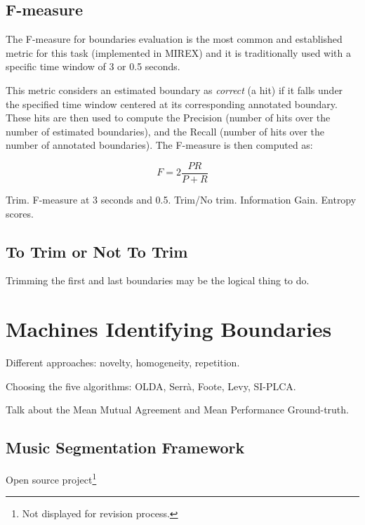 \documentclass{article}
\begin{document}
\subsection{F-measure}

The F-measure for boundaries evaluation is the most common and established metric for this task (implemented in MIREX) and it is traditionally used with a specific time window of 3 or 0.5 seconds\cite{Ong2005}. 

This metric considers an estimated boundary as \emph{correct} (a hit) if it falls under the specified time window centered at its corresponding annotated boundary.
These hits are then used to compute the Precision (number of hits over the number of estimated boundaries), and the Recall (number of hits over the number of annotated boundaries).
The F-measure is then computed as:

\begin{equation}
  F = 2 \frac{P R}{P + R}
\end{equation}

Trim\cite{Nieto2013}.
F-measure at 3 seconds and 0.5. Trim/No trim. Information Gain. Entropy scores.

\subsection{To Trim or Not To Trim}

Trimming the first and last boundaries may be the logical thing to do.

\section{Machines Identifying Boundaries}\label{sec:eval_desc}

Different approaches: novelty, homogeneity, repetition.

Choosing the five algorithms: OLDA\cite{McFee2014}, Serr\`a\cite{Serra2013},
Foote\cite{Foote1999}, Levy\cite{Levy2008}, SI-PLCA\cite{Weiss2011}.

Talk about the Mean Mutual Agreement and Mean Performance Ground-truth\cite{Holzapfel2012}.

\subsection{Music Segmentation Framework}

Open source project\footnote{Not displayed for revision process.}
\end{document}
